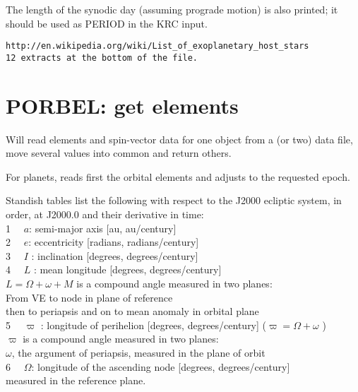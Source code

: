 \documentclass[draft]{article}  %
\newcommand{\qi}{\\ \hspace*{2.em}}      %
\newcommand{\qii}{\\ \hspace*{4.em}}     %
\newcommand{\qiii}{\\ \hspace*{6.em}}    %
\begin{document}
The length of the synodic day (assuming prograde motion) is also printed; it should be used as PERIOD in the KRC input. 

\begin{verbatim} 
http://en.wikipedia.org/wiki/List_of_exoplanetary_host_stars 
12 extracts at the bottom of the file.
\end{verbatim}
\section{PORBEL: get elements} %
Will read elements and spin-vector data for one object from a (or two) data file, move several values into common and return others.

For planets, reads first the orbital elements and adjusts to the requested epoch. 

Standish tables list the following with respect to the J2000 ecliptic system, in order, at J2000.0 and their derivative in time:
\qi 1 \ \ $a$: semi-major axis [au, au/century]
\qi 2 \ \ $e$: eccentricity [radians, radians/century]
\qi 3 \ \ $I$ : inclination [degrees, degrees/century]
\qi 4 \ \ $L$ : mean longitude [degrees, degrees/century]
\qii   $L=\Omega +\omega + M$  is a compound angle measured in two planes: 
\qiii From VE to node in plane of reference
\qiii then to periapsis and on to mean anomaly in orbital plane
\qi 5 \ \ $\varpi$ : longitude of perihelion [degrees, degrees/century] ($\varpi= \Omega+ \omega    $ ) 
\qii   $\varpi$ is a compound angle measured in two planes:
\qiii $\omega$, the argument of periapsis, measured in the plane of orbit 
\qi 6 \ \ $\Omega$:  longitude of the ascending node [degrees, degrees/century]
\qii  measured in the reference plane.

\appendix
\end{document}
